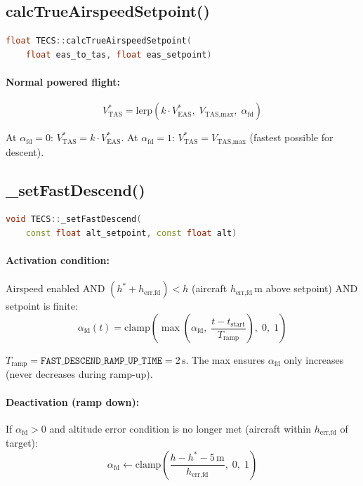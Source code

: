 \documentclass[12pt,a4paper]{article}
\begin{document}
\subsection{calcTrueAirspeedSetpoint()}

\begin{lstlisting}[language=C++]
float TECS::calcTrueAirspeedSetpoint(
    float eas_to_tas, float eas_setpoint)
\end{lstlisting}

\paragraph{Normal powered flight:}
\begin{equation}
  V^*_{\text{TAS}} = \text{lerp}\!\left(k \cdot V^*_{\text{EAS}},\;
    V_{\text{TAS,max}},\; \alpha_{\text{fd}}\right)
\end{equation}

At $\alpha_{\text{fd}} = 0$: $V^*_{\text{TAS}} = k \cdot V^*_{\text{EAS}}$.
At $\alpha_{\text{fd}} = 1$: $V^*_{\text{TAS}} = V_{\text{TAS,max}}$
(fastest possible for descent).

\subsection{\_setFastDescend()}

\begin{lstlisting}[language=C++]
void TECS::_setFastDescend(
    const float alt_setpoint, const float alt)
\end{lstlisting}

\paragraph{Activation condition:}
Airspeed enabled AND
$(h^* + h_{\text{err,fd}}) < h$ (aircraft $h_{\text{err,fd}}$\,m above
setpoint) AND setpoint is finite:
\begin{equation}
  \alpha_{\text{fd}}(t) = \text{clamp}\!\left(
    \max\!\left(\alpha_{\text{fd}},\;
      \frac{t - t_{\text{start}}}{T_{\text{ramp}}}\right),\;0,\;1\right)
\end{equation}

$T_{\text{ramp}} = \texttt{FAST\_DESCEND\_RAMP\_UP\_TIME} = 2\,\text{s}$.
The max ensures $\alpha_{\text{fd}}$ only increases (never decreases during
ramp-up).

\paragraph{Deactivation (ramp down):}
If $\alpha_{\text{fd}} > 0$ and altitude error condition is no longer met
(aircraft within $h_{\text{err,fd}}$ of target):
\begin{equation}
  \alpha_{\text{fd}} \leftarrow \text{clamp}\!\left(
    \frac{h - h^* - 5\,\text{m}}{h_{\text{err,fd}}},\;0,\;1\right)
\end{equation}
\end{document}
